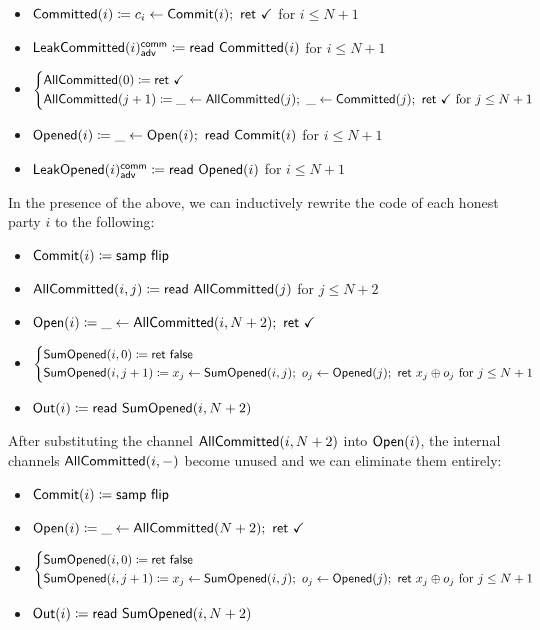 \begin{itemize}
\item {\color{magenta} $\mathsf{Committed}(i) \coloneqq c_i \leftarrow \mathsf{Commit}(i); \ \mathsf{ret} \ \checkmark$ for $i \leq N+1$}
\item {\color{magenta} $\mathsf{LeakCommitted}(i)^{\mathsf{comm}}_{\mathsf{adv}} \coloneqq \mathsf{read} \ \mathsf{Committed}(i)$ for $i \leq N+1$}
\item {\color{magenta} $\begin{cases*} \AllCommitted(0) \coloneqq \ret{\checkmark} \\ \AllCommitted(j+1) \coloneqq \_ \leftarrow \AllCommitted(j); \ \_ \leftarrow \Committed(j); \ \ret{\checkmark} \text{ for $j \leq N+1$} \end{cases*}$}
\item {\color{red} $\mathsf{Opened}(i) \coloneqq \_ \leftarrow \mathsf{Open}(i); \ \mathsf{read} \ \mathsf{Commit}(i)$ for $i \leq N+1$}
\item {\color{red} $\mathsf{LeakOpened}(i)^{\mathsf{comm}}_{\mathsf{adv}} \coloneqq \mathsf{read} \ \mathsf{Opened}(i)$ for $i \leq N+1$}
\end{itemize}

\noindent In the presence of the above, we can inductively rewrite the code of each honest party $i$ to the following:

\begin{itemize}
\item {\color{blue} $\mathsf{Commit}(i) \coloneqq \mathsf{samp} \ \mathsf{flip}$}
\item {\color{magenta} $\mathsf{AllCommitted}(i,j) \coloneqq \mathsf{read} \ \mathsf{AllCommitted}(j)$ for $j \leq N+2$}
\item {\color{teal} $\Open(i) \coloneqq \_ \leftarrow \AllCommitted(i,N+2); \ \ret{\checkmark}$}
\item {\color{red} $\begin{cases*} \SumOpened(i,0) \coloneqq \ret{\false} \\ \SumOpened(i,j+1) \coloneqq x_j \leftarrow \SumOpened(i,j); \ o_j \leftarrow \Opened(j); \ \ret{x_j \oplus o_j} \text{ for $j \leq N+1$} \end{cases*}$}
\item $\mathsf{Out}(i) \coloneqq \mathsf{read} \ \mathsf{SumOpened}(i,N+2)$
\end{itemize}

\noindent After substituting the channel $\mathsf{AllCommitted}(i,N+2)$ into $\mathsf{Open}(i)$, the internal channels $\mathsf{AllCommitted}(i,-)$ become unused and we can eliminate them entirely:

\begin{itemize}
\item {\color{blue} $\mathsf{Commit}(i) \coloneqq \mathsf{samp} \ \mathsf{flip}$}
\item {\color{teal} $\Open(i) \coloneqq \_ \leftarrow \AllCommitted(N+2); \ \ret{\checkmark}$}
\item {\color{red} $\begin{cases*} \SumOpened(i,0) \coloneqq \ret{\false} \\ \SumOpened(i,j+1) \coloneqq x_j \leftarrow \SumOpened(i,j); \ o_j \leftarrow \Opened(j); \ \ret{x_j \oplus o_j} \text{ for $j \leq N+1$} \end{cases*}$}
\item $\mathsf{Out}(i) \coloneqq \mathsf{read} \ \mathsf{SumOpened}(i,N+2)$
\end{itemize}

